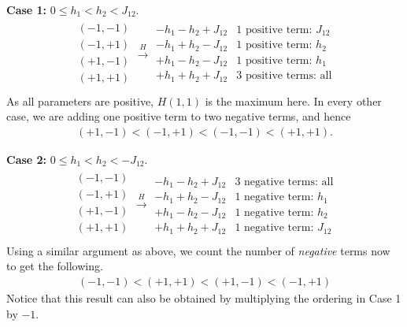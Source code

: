 \textbf{Case 1:} $0 \leq h_1 < h_2 < J_{12}$.
\begin{align*}
	\begin{array}{c}
		(-1,-1) \\
		(-1,+1) \\
		(+1,-1) \\
		(+1,+1) \\
	\end{array} \xrightarrow{H}
	\begin{array}{c|c}
		-h_1-h_2+J_{12} & \text{1 positive term: } J_{12}\\
		-h_1+h_2-J_{12} & \text{1 positive term: } h_2\\
		+h_1-h_2-J_{12} & \text{1 positive term: } h_1\\
		\hline
		+h_1+h_2+J_{12} & \text{3 positive terms: all} \\
	\end{array}
\end{align*}
As all parameters are positive, $H(1,1)$ is the maximum here. In every other case, we are adding one positive term to two negative terms, and hence
\begin{align*}
	(+1,-1) < (-1,+1) < (-1,-1) < (+1,+1).
\end{align*}

\bigskip

\textbf{Case 2:} $0 \leq h_1 < h_2 < -J_{12}$.
\begin{align*}
	\begin{array}{c}
		(-1,-1) \\
		(-1,+1) \\
		(+1,-1) \\
		(+1,+1) \\
	\end{array} \xrightarrow{H}
	\begin{array}{c|c}
		-h_1-h_2+J_{12} & \text{3 negative terms: all}\\
		-h_1+h_2-J_{12} & \text{1 negative term: } h_1\\
		+h_1-h_2-J_{12} & \text{1 negative term: } h_2\\
		\hline
		+h_1+h_2+J_{12} & \text{1 negative term: } J_{12}
	\end{array}
\end{align*}
Using a similar argument as above, we count the number of \emph{negative} terms now to get the following.
\begin{align*}
	(-1,-1) < (+1,+1) < (+1,-1) < (-1,+1)
\end{align*}
Notice that this result can also be obtained by multiplying the ordering in Case 1 by $-1$.

